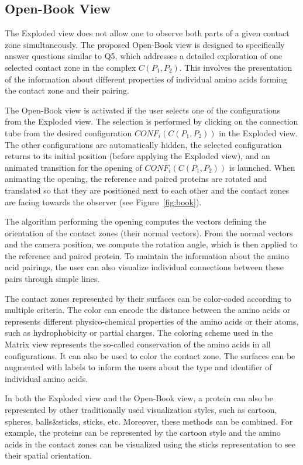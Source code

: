 \documentclass[twocolumn]{bmcart}%
\def\OpBook {Open-Book view\xspace}
\def\ExpView {Exploded view\xspace}
\def\MatView {Matrix view\xspace}
\begin{document}

\subsection*{Open-Book View}
The \ExpView does not allow one to observe both parts of a given contact zone simultaneously.
The proposed \OpBook is designed to specifically answer questions similar to Q5, which addresses a detailed exploration of one selected contact zone in the complex $C(P_1,P_2)$.
This involves the presentation of the information about different properties of individual amino acids forming the contact zone and their pairing.

The \OpBook is activated if the user selects one of the configurations from the \ExpView. 
The selection is performed by clicking on the connection tube from the desired configuration $CONF_i(C(P_1,P_2))$ in the \ExpView.
The other configurations are automatically hidden, the selected configuration returns to its initial position (before applying the \ExpView), and an animated transition for the opening of $CONF_i(C(P_1,P_2))$ is launched.
When animating the opening, the reference and paired proteins are rotated and translated so that they are positioned next to each other and the contact zones are facing towards the observer (see Figure~\ref{fig:book}). 

The algorithm performing the opening computes the vectors defining the orientation of the contact zones (their normal vectors). 
From the normal vectors and the camera position, we compute the rotation angle, which is then applied to the reference and paired protein.
To maintain the information about the amino acid pairings, the user can also visualize individual connections between these pairs through simple lines.

The contact zones represented by their surfaces can be color-coded according to multiple criteria.
The color can encode the distance between the amino acids or represents different physico-chemical properties of the amino acids or their atoms, such as hydrophobicity or partial charges.
The coloring scheme used in the \MatView represents the so-called conservation of the amino acids in all configurations.
It can also be used to color the contact zone.
The surfaces can be augmented with labels to inform the users about the type and identifier of individual amino acids.

In both the \ExpView and the \OpBook, a protein can also be represented by other traditionally used visualization styles, such as cartoon, spheres, balls\&sticks, sticks, etc.
Moreover, these methods can be combined. 
For example, the proteins can be represented by the cartoon style and the amino acids in the contact zones can be visualized using the sticks representation to see their spatial orientation.
\end{document}
